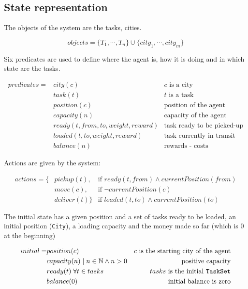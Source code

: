 \documentclass[11pt,a4paper]{article}
\begin{document}
\newpage
\subsection*{State representation}

The objects of the system are the tasks, cities.

$$ objects = \{T_1, \cdots, T_n\} \cup \{city_1, \cdots, city_m\} $$

Six predicates are used to define where the agent is, how it is doing and in
which state are the tasks.

\begin{align*}
predicates = &city(c)                            & c \text{ is a city} \\
             &task(t)                            & t \text{ is a task} \\
             &position(c)                        & \text{position of the agent}      \\
             &capacity(n)                        & \text{capacity of the agent}      \\
             &ready(t, from, to, weight, reward) & \text{task ready to be picked-up} \\
             &loaded(t, to, weight, reward)      & \text{task currently in transit}  \\
             &balance(n)                         & \text{rewards - costs}
\end{align*}

Actions are given by the system:

\begin{align*}
actions = \{&pickup(t),   & \text{if } ready(t, from) \wedge currentPosition(from) \\
            &move(c),     & \text{if } \lnot currentPosition(c)                    \\
            &deliver(t)\} & \text{if } loaded(t, to) \wedge currentPosition(to)
\end{align*}

The initial state has a given position and a set of tasks ready to be loaded,
an initial position (\texttt{City}), a loading capacity and the money made so
far (which is $0$ at the beginning)

\begin{align*}
    initial = &position(c)                            & c \text{ is the starting city of the agent} \\
              &capacity(n) \; | \; n \in \mathbb{N} \wedge n > 0   & \text{positive capacity} \\
              &ready(t) \; \forall t \in tasks                   & tasks \text{ is the initial \texttt{TaskSet}} \\
              &balance(0) & \text{initial balance is zero}
\end{align*}
\end{document}
